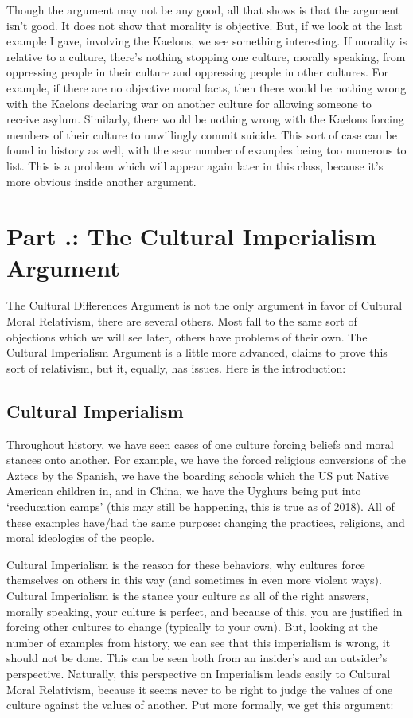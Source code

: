 Though the argument may not be any good, all that shows is that the argument isn't good. It does not show that morality is objective. But, if we look at the last example I gave, involving the Kaelons, we see something interesting. If morality is relative to a culture, there's nothing stopping one culture, morally speaking, from oppressing people in their culture and oppressing people in other cultures. For example, if there are no objective moral facts, then there would be nothing wrong with the Kaelons declaring war on another culture for allowing someone to receive asylum. Similarly, there would be nothing wrong with the Kaelons forcing members of their culture to unwillingly commit suicide. This sort of case can be found in history as well, with the sear number of examples being too numerous to list. This is a problem which will appear again later in this class, because it's more obvious inside another argument.  

\section{Part \thechapcount.\theseccount: The Cultural Imperialism Argument}

The Cultural Differences Argument is not the only argument in favor of Cultural Moral Relativism, there are several others. Most fall to the same sort of objections which we will see later, others have problems of their own. The Cultural Imperialism Argument is a little more advanced, claims to prove this sort of relativism, but it, equally, has issues.  Here is the introduction:

\subsection{Cultural Imperialism}

Throughout history, we have seen cases of one culture forcing beliefs and moral stances onto another. For example, we have the forced religious conversions of the Aztecs by the Spanish, we have the boarding schools which the US put Native American children in, and in China, we have the Uyghurs being put into `reeducation camps' (this may still be happening, this is true as of 2018). All of these examples have/had the same purpose: changing the practices, religions, and moral ideologies of the people.  

Cultural Imperialism is the reason for these behaviors, why cultures force themselves on others in this way (and sometimes in even more violent ways). Cultural Imperialism is the stance your culture as all of the right answers, morally speaking, your culture is perfect, and because of this, you are justified in forcing other cultures to change (typically to your own). But, looking at the number of examples from history, we can see that this imperialism is wrong, it should not be done. This can be seen both from an insider's and an outsider's perspective. Naturally, this perspective on Imperialism leads easily to Cultural Moral Relativism, because it seems never to be right to judge the values of one culture against the values of another. Put more formally, we get this argument:

